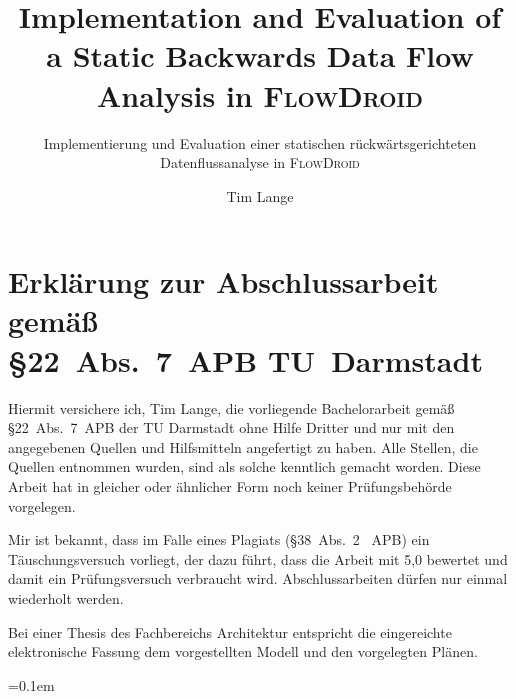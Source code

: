 \documentclass[
	english,
	ruledheaders=section,%
	class=report,%
	thesis={type=bachelor},%
	accentcolor=9c,%
	custommargins=true,%
	marginpar=false,%
	parskip=half-,%
	fontsize=11pt,%
	IMRAD=false,
	instbox=false,
]{tudapub}
\title{Implementation and Evaluation of a Static Backwards Data Flow Analysis in \textsc{FlowDroid}}
\subtitle{Implementierung und Evaluation einer statischen rückwärtsgerichteten Datenflussanalyse in \textsc{FlowDroid}}
\author[T. Lange]{Tim Lange}%
\institute{Fraunhofer SIT}
\begin{document}
\maketitle

\tableofcontents
\newpage

\section*{Erklärung zur Abschlussarbeit gemäß\\ \S{}22~Abs.~7~APB TU~Darmstadt}
\begin{sloppypar}%
Hiermit versichere ich, Tim Lange, die vorliegende Bachelorarbeit gemäß \S{}22~Abs.~7~APB der TU Darmstadt ohne Hilfe Dritter und nur mit den angegebenen Quellen und Hilfsmitteln angefertigt zu haben.
Alle Stellen, die Quellen entnommen wurden, sind als solche kenntlich gemacht worden. Diese Arbeit hat in gleicher oder ähnlicher Form noch keiner Prüfungsbehörde vorgelegen.
\end{sloppypar}%
\par
Mir ist bekannt, dass im Falle eines Plagiats (\S{}38~Abs.~2 ~APB) ein Täuschungsversuch vorliegt, der dazu führt, dass die Arbeit mit 5,0 bewertet und damit ein Prüfungsversuch verbraucht wird. Abschlussarbeiten dürfen nur einmal wiederholt werden.
\par
Bei einer Thesis des Fachbereichs Architektur entspricht die eingereichte elektronische Fassung dem vorgestellten Modell und den vorgelegten Plänen.
\AffidavitSignature










{
	\emergencystretch=0.1em
	\printbibliography[
		heading=bibintoc,
		title={Bibliography}
	]
}


\end{document}
